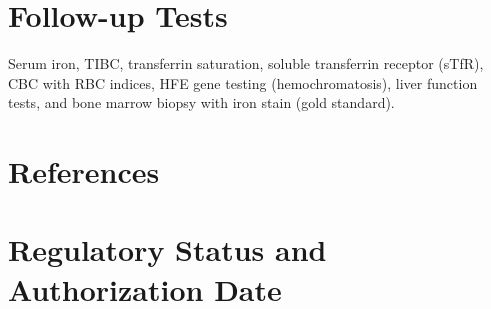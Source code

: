 \section*{Follow-up Tests}
Serum iron, TIBC, transferrin saturation, soluble transferrin receptor (sTfR), CBC with RBC indices, HFE gene testing (hemochromatosis), liver function tests, and bone marrow biopsy with iron stain (gold standard).
\section*{References}


\clearpage
\section*{Regulatory Status and Authorization Date}

\clearpage
